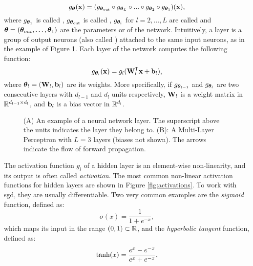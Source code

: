 $$g_{\Param}(\Vector{x}) = (g_{\Param_\mathrm{out}} \circ g_{\Param_L} \circ ... \circ g_{\Param_{\mathrm{2}}} \circ g_{\Param_{\mathrm{1}}})(\Vector{x}),$$
where $g_{\boldsymbol{\theta}_{\mathrm{1}}}$ is called , $g_{\boldsymbol{\theta}_\mathrm{out}}$
is called , $g_{\boldsymbol{\theta}_l}$ for $l = 2, \ldots, L$ are called  and $\boldsymbol{\theta} = (\boldsymbol{\theta}_{out}, \ldots, \boldsymbol{\theta}_{1})$ are the parameters or  of the network. Intuitively, a layer is a group of output neurons
(also called ) attached to the same input neurons, as in the example of Figure \ref{fig:layer}. Each layer of the network computes the following function:
$$ g_{\Param_{l}}(\Vector{x}) = g_l(\Matrix{W}_l^{\Transpose}\Vector{x} + \Vector{b}_l),$$ where $\Param_l = (\Matrix{W}_l, \Vector{b}_l)$ are its weights. More specifically, if $g_{\boldsymbol{\theta}_{l-1}}$ and $g_{\boldsymbol{\theta}_{l}}$ are two consecutive layers with $d_{l-1}$ and $d_{l}$ units respectively,  $\Matrix{W}_{l}$ is a weight matrix in $\mathbb{R}^{d_{l-1} \times d_{l}}$, and $\Vector{b}_{l}$ is a
bias vector in $\mathbb{R}^{d_l}$. 
\begin{figure*}[h!]
    \begin{subfigure}[b]{0.45\linewidth}
        \centering
        \resizebox{.8\textwidth}{!}{}
        \caption{}
        \label{fig:layer}
    \end{subfigure}
    \begin{subfigure}[b]{0.45\linewidth}
        \centering
        \resizebox{.8\textwidth}{!}{}
        \caption{}
        \label{fig:network}
    \end{subfigure}
    \caption{(A) An example of a neural network layer. The superscript above the units indicates the layer they belong to. (B): A Multi-Layer Perceptron
    with $L=3$ layers (biases not shown). The arrows indicate the flow of forward propagation.}
\end{figure*}
The activation function $g_l$ of a hidden layer is an element-wise non-linearity, and its output is often called \emph{activation}. The most common non-linear activation functions for hidden layers are shown in Figure \ref{fig:activations}. To work with \gls{sgd}, they are usually differentiable. Two very common examples are the \emph{sigmoid} function, defined as:
$$\sigma(x) = \frac{1}{1 + e^{-x}},$$
which maps its input in the range $(0, 1) \subset \mathbb{R}$, and the \emph{hyperbolic tangent} function, defined as:
$$\mathrm{tanh}(x) = \frac{e^x - e^{-x}}{e^x + e^{-x}},$$
